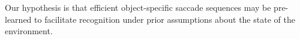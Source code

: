 \documentclass[12pt,twoside,openright]{article}
\begin{document}
	{\color{magenta} Our hypothesis is that efficient object-specific saccade sequences may be pre-learned to facilitate recognition under prior assumptions about the state of the environment. }
		
		
	
	
	
\begin{footnotesize}


\end{footnotesize}	
	
\end{document}
